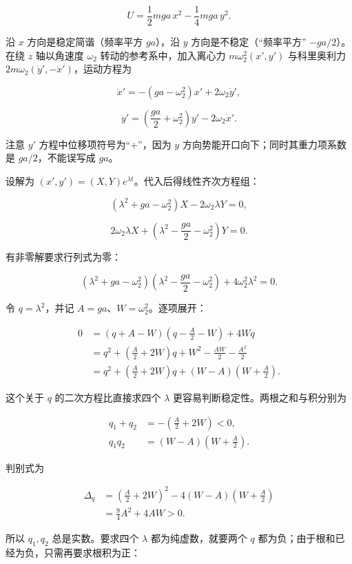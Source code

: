 \documentclass[12pt,a4paper,UTF8]{ctexart}
\begin{document}
\[
U=\frac12mga\,x^2-\frac14mga\,y^2. \tag{12}
\]

沿 \(x\) 方向是稳定简谐（频率平方 \(ga\)），沿 \(y\)
方向是不稳定（``频率平方'' \(-ga/2\)）。在绕 \(z\) 轴以角速度
\(\omega_2\) 转动的参考系中，加入离心力 \(m\omega_2^2(x',y')\)
与科里奥利力 \(2m\omega_2(\dot y',-\dot x')\)，运动方程为

\[
\ddot x'=-(ga-\omega_2^2)x'+2\omega_2\dot y', \tag{13}
\]

\[
\ddot y'=\left(\frac{ga}{2}+\omega_2^2\right)y'-2\omega_2\dot x'. \tag{14}
\]

注意 \(y'\) 方程中位移项符号为``+''，因为 \(y\)
方向势能开口向下；同时其重力项系数是 \(ga/2\)，不能误写成 \(ga\)。

设解为 \((x',y')=(X,Y)e^{\lambda t}\)。代入后得线性齐次方程组：

\[
(\lambda^2+ga-\omega_2^2)X-2\omega_2\lambda Y=0, \tag{15}
\]

\[
2\omega_2\lambda X+
\left(\lambda^2-\frac{ga}{2}-\omega_2^2\right)Y=0. \tag{16}
\]

有非零解要求行列式为零：

\[
(\lambda^2+ga-\omega_2^2)
\left(\lambda^2-\frac{ga}{2}-\omega_2^2\right)
+4\omega_2^2\lambda^2=0.
\]

令 \(q=\lambda^2\)，并记 \(A=ga\)、\(W=\omega_2^2\)。逐项展开：

\[
\begin{aligned}
0
&=(q+A-W)\left(q-\frac A2-W\right)+4Wq\\
&=q^2+\left(\frac A2+2W\right)q
+W^2-\frac{AW}{2}-\frac{A^2}{2}\\
&=q^2+\left(\frac A2+2W\right)q
+(W-A)\left(W+\frac A2\right).
\end{aligned}
\tag{17}
\]

这个关于 \(q\) 的二次方程比直接求四个 \(\lambda\)
更容易判断稳定性。两根之和与积分别为

\[
\begin{aligned}
q_1+q_2&=-\left(\frac A2+2W\right)<0,\\
q_1q_2&=(W-A)\left(W+\frac A2\right). 
\end{aligned}
\tag{18}
\]

判别式为

\[
\begin{aligned}
\Delta_q
&=\left(\frac A2+2W\right)^2
-4(W-A)\left(W+\frac A2\right)\\
&=\frac94A^2+4AW>0. 
\end{aligned}
\tag{19}
\]

所以 \(q_1,q_2\) 总是实数。要求四个 \(\lambda\) 都为纯虚数，就要两个
\(q\) 都为负；由于根和已经为负，只需再要求根积为正：
\end{document}
